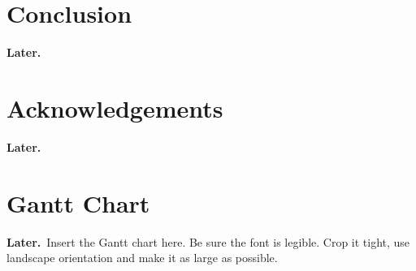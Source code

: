 \documentclass[onecolumn,10pt]{IEEEtran}
\newcommand{\myroot}{../}
\newcommand{\Later}{\textbf{Later.}}
\begin{document}

\section{Conclusion}
\Later

\section*{Acknowledgements}
\Later




\appendix
\section{Gantt Chart}
\Later\ Insert the Gantt chart here.  Be sure the font is legible.   Crop it tight, use landscape orientation and make it as large as possible.
\end{document}
